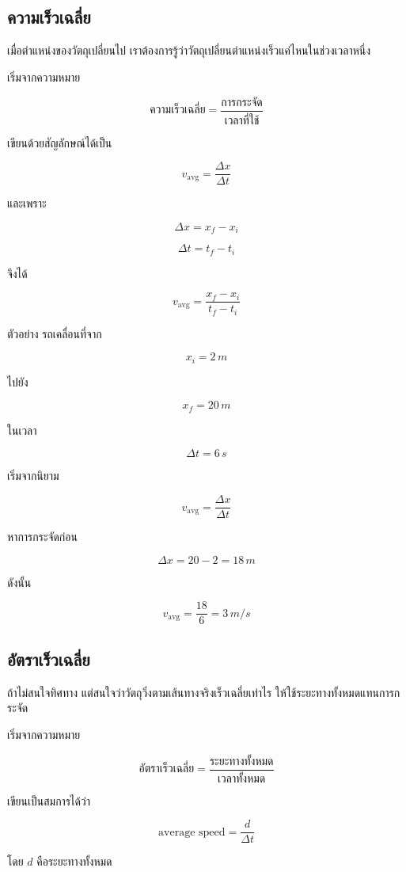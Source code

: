 \documentclass[12pt,a4paper]{report}
\begin{document}
\subsection{ความเร็วเฉลี่ย}

เมื่อตำแหน่งของวัตถุเปลี่ยนไป เราต้องการรู้ว่าวัตถุเปลี่ยนตำแหน่งเร็วแค่ไหนในช่วงเวลาหนึ่ง

เริ่มจากความหมาย

\[
\text{ความเร็วเฉลี่ย} = \frac{\text{การกระจัด}}{\text{เวลาที่ใช้}}
\]

เขียนด้วยสัญลักษณ์ได้เป็น

\[
v_{\text{avg}}=\frac{\Delta x}{\Delta t}
\]

และเพราะ

\[
\Delta x=x_f-x_i
\]

\[
\Delta t=t_f-t_i
\]

จึงได้

\[
v_{\text{avg}}=\frac{x_f-x_i}{t_f-t_i}
\]

\begin{examplebox}{ตัวอย่าง}
รถเคลื่อนที่จาก

\[
x_i=2\,\si{m}
\]

ไปยัง

\[
x_f=20\,\si{m}
\]

ในเวลา

\[
\Delta t=6\,\si{s}
\]

เริ่มจากนิยาม

\[
v_{\text{avg}}=\frac{\Delta x}{\Delta t}
\]

หาการกระจัดก่อน

\[
\Delta x=20-2=18\,\si{m}
\]

ดังนั้น

\[
v_{\text{avg}}=\frac{18}{6}=3\,\si{m/s}
\]
\end{examplebox}

\subsection{อัตราเร็วเฉลี่ย}

ถ้าไม่สนใจทิศทาง แต่สนใจว่าวัตถุวิ่งตามเส้นทางจริงเร็วเฉลี่ยเท่าไร ให้ใช้ระยะทางทั้งหมดแทนการกระจัด

เริ่มจากความหมาย

\[
\text{อัตราเร็วเฉลี่ย}=\frac{\text{ระยะทางทั้งหมด}}{\text{เวลาทั้งหมด}}
\]

เขียนเป็นสมการได้ว่า

\[
\text{average speed}=\frac{d}{\Delta t}
\]

โดย $d$ คือระยะทางทั้งหมด
\end{document}
